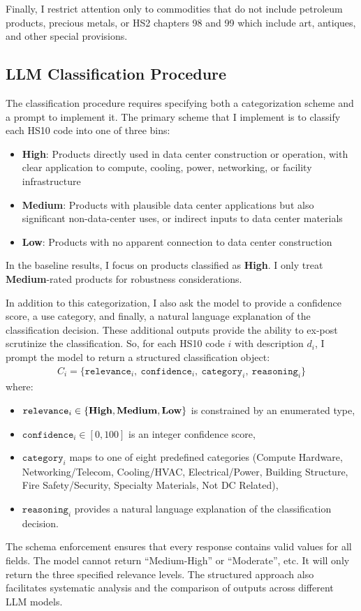 \documentclass[12pt,pdftex]{article}
\begin{document}
\begin{onehalfspacing}
Finally, I restrict attention only to commodities that do not include petroleum products, precious metals, or HS2 chapters 98 and 99 which include art, antiques, and other special provisions. 

\subsection{LLM Classification Procedure}

The classification procedure requires specifying both a categorization scheme and a prompt to implement it. The primary scheme that I implement is to classify each HS10 code into one of three bins:
\begin{itemize}
    \item \textbf{High}: Products directly used in data center construction or operation, with clear application to compute, cooling, power, networking, or facility infrastructure
    \item \textbf{Medium}: Products with plausible data center applications but also significant non-data-center uses, or indirect inputs to data center materials
    \item \textbf{Low}: Products with no apparent connection to data center construction
\end{itemize}
In the baseline results, I focus on products classified as \textbf{High}. I only treat \textbf{Medium}-rated products for robustness considerations.

In addition to this categorization, I also ask the model to provide a confidence score, a use category, and finally, a natural language explanation of the classification decision. These additional outputs provide the ability to ex-post scrutinize the classification. So, for each HS10 code $i$ with description $d_i$, I prompt the model to return a structured classification object:
\begin{align*}
    C_i = \{\texttt{relevance}_i, \ \texttt{confidence}_i, \ \texttt{category}_i, \ \texttt{reasoning}_i\}
\end{align*}
\noindent where:
\begin{itemize}
    \item $\texttt{relevance}_i \in \{\text{\textbf{High}}, \text{\textbf{Medium}}, \text{\textbf{Low}}\}$ is constrained by an enumerated type,
    \item $\texttt{confidence}_i \in [0, 100]$ is an integer confidence score,
    \item $\texttt{category}_i$ maps to one of eight predefined categories (Compute Hardware, Networking/Telecom, Cooling/HVAC, Electrical/Power, Building Structure, Fire Safety/Security, Specialty Materials, Not DC Related),
    \item $\texttt{reasoning}_i$ provides a natural language explanation of the classification decision.
\end{itemize}
The schema enforcement ensures that every response contains valid values for all fields. The model cannot return ``Medium-High'' or ``Moderate'', etc. It will only return the three specified relevance levels. The structured approach also facilitates systematic analysis and the comparison of outputs across different LLM models.


\end{onehalfspacing}
\end{document}
